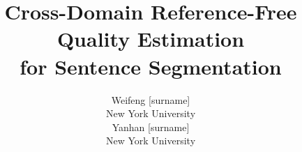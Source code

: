 \documentclass[11pt]{article}
\title{Cross-Domain Reference-Free Quality Estimation\\for Sentence Segmentation}
\author{Weifeng [surname] \\
  New York University \\
  \And
  Yanhan [surname] \\
  New York University}
\begin{document}
\maketitle















\clearpage
\appendix
\onecolumn








\end{document}
